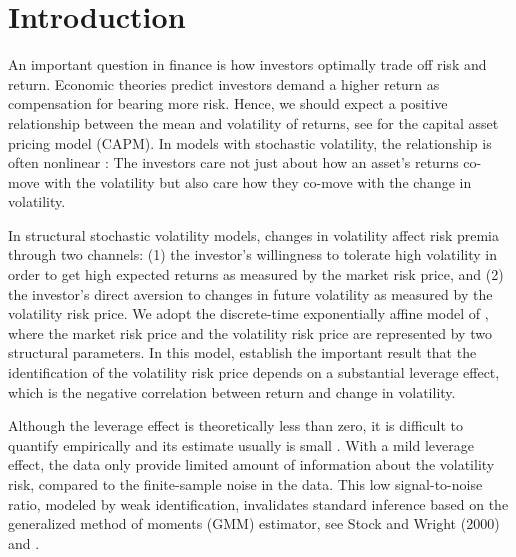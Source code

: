 \documentclass[11pt, letterpaper, twoside]{article}
\begin{document}
\clearpage

\section{Introduction}

An important question in finance is how investors optimally trade off risk and return. Economic theories predict investors demand a higher return as compensation for bearing more risk. Hence, we should expect a positive relationship between the mean and volatility of returns, see  for the capital asset pricing model (CAPM).  %
In models with stochastic volatility, the relationship is often nonlinear \parencites{bansal2014volatility, dewbecker2017price}: %
The investors care not just about how an asset's returns co-move with the volatility but also care how they co-move with the change in volatility. %


In structural stochastic volatility models, changes in volatility affect risk premia through two channels: (1) the investor's willingness to tolerate high volatility in order to get high expected returns as measured by the market risk price, and (2) the investor’s direct aversion to changes in future volatility as measured by the volatility risk price. We adopt the discrete-time exponentially affine model of \textcite{han2018leverage}, where the market risk price and the volatility risk price are represented by two structural parameters. In this model,  \textcite{han2018leverage} establish the important result that the identification of the volatility risk price depends on a substantial leverage effect, which is the negative correlation between return and change in volatility. 

Although the leverage effect is theoretically less than zero, it is difficult to quantify empirically and its estimate usually is small \parencites{aitsahalia2013leverage}. With a mild leverage effect, the data only provide limited amount of information about the volatility risk, compared to the finite-sample noise in the data. This low signal-to-noise ratio,  modeled by weak identification, invalidates standard inference based on the generalized method of moments (GMM) estimator, see Stock and Wright (2000) and \textcite{andrews2012estimation}.
\end{document}
